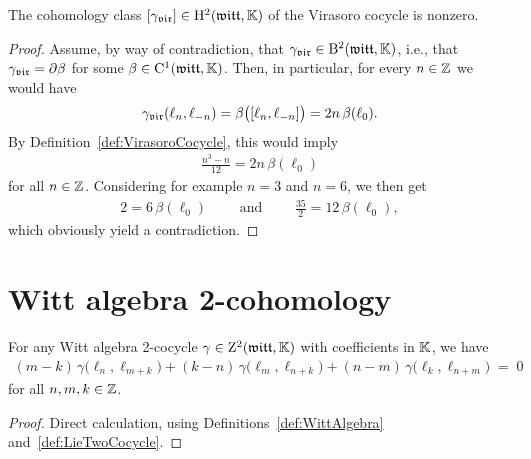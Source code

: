 \begin{lemma}
  \label{lem:VirasoroCocycleNontrivial}
  \leanok
  The cohomology class $[{\gamma}_{\mathfrak{vir}}] \in \mathrm{H}^2(\mathfrak{witt},\mathbb{K})$
  of the Virasoro cocycle is nonzero.
\end{lemma}
\begin{proof}
  \leanok
  Assume, by way of contradiction, that ${\gamma}_{\mathfrak{vir}} \in \mathrm{B}^2(\mathfrak{witt},\mathbb{K})$,
  i.e., that ${\gamma}_{\mathfrak{vir}} = \partial \beta$ for some $\beta \in \mathrm{C}^1(\mathfrak{witt},\mathbb{K})$.
  Then, in particular, for every $n \in \mathbb{Z}$ we would have
  \begin{align*}
    {\gamma}_{\mathfrak{vir}}(\ell_n,\ell_{-n})
      = \beta \big( [\ell_n, \ell_{-n}] \big) = 2 n \, \beta ( \ell_0 ) .
  \end{align*}
  By Definition~\ref{def:VirasoroCocycle}, this would imply
  \begin{align*}
    \frac{n^3-n}{12} = 2 n \, \beta ( \ell_0 )
  \end{align*}
  for all $n \in \mathbb{Z}$. Considering for example $n=3$ and $n=6$, we then get
  \begin{align*}
    2 = 6 \, \beta (\ell_0)
    \qquad \text{ and } \qquad
    \frac{35}{2} = 12 \,  \beta (\ell_0) ,
  \end{align*}
  which obviously yield a contradiction.
\end{proof}

\section{Witt algebra 2-cohomology}

\begin{lemma}
  \label{lem:WittTwoCocycleEquation}
  \leanok
  For any Witt algebra 2-cocycle $\gamma \in \mathrm{Z}^2(\mathfrak{witt},\mathbb{K})$ with coefficients
  in $\mathbb{K}$, we have
  \begin{align*}
       (m-k) \, \gamma \big( \ell_n , \ell_{m+k} \big)
     + (k-n) \, \gamma \big( \ell_{m} , \ell_{n+k} \big)
     + (n-m) \, \gamma \big( \ell_k , \ell_{n+m} \big)
     \; = \; 0
  \end{align*}
  for all $n,m,k \in \mathbb{Z}$.
\end{lemma}
\begin{proof}
  \leanok
  Direct calculation, using Definitions~\ref{def:WittAlgebra}
  and~\ref{def:LieTwoCocycle}.
\end{proof}

